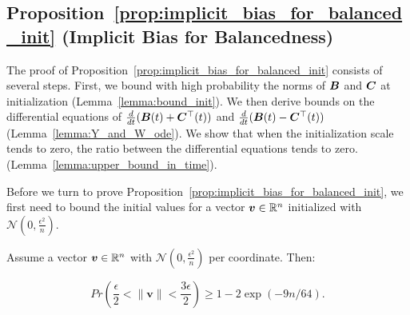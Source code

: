 \subsection{Proposition~\ref{prop:implicit_bias_for_balanced_init} (Implicit Bias for Balancedness)}
\label{sec:apdx:bias_to_symmetry} 

The proof of Proposition~\ref{prop:implicit_bias_for_balanced_init} consists of several steps. First, we bound with high probability the norms of ${\bm{B}}$ and ${\bm{C}}$ at initialization (Lemma~\ref{lemma:bound_init}). We then derive bounds on the differential equations of $\frac{d}{dt}({\bm{B}}(t)+{\bm{C}}^\top(t))$ and $\frac{d}{dt}({\bm{B}}(t)-{\bm{C}}^\top(t))$ (Lemma~\ref{lemma:Y_and_W_ode}). We show that when the initialization scale tends to zero, the ratio between the differential equations tends to zero. (Lemma~\ref{lemma:upper_bound_in_time}). %

Before we turn to prove Proposition~\ref{prop:implicit_bias_for_balanced_init}, we first need to bound the initial values for a vector ${\bm{v}}\in\mathbb{R}^n$ initialized with $\mathcal{N}(0,\frac{\epsilon^2}{n})$.

\begin{lemma}\label{lemma:bound_init}
    Assume a vector ${\bm{v}} \in \mathbb{R}^n$ with $\mathcal{N}(0,\frac{\epsilon^2}{n})$ per coordinate. Then:

\begin{equation}\label{eq:init_bound}
    Pr\left(\frac{\epsilon}{2}< \|\mathbf{v}\| < \frac{3\epsilon}{2} \right) \geq 1- 2 \exp(-9n/64 ).
\end{equation}
\end{lemma}

